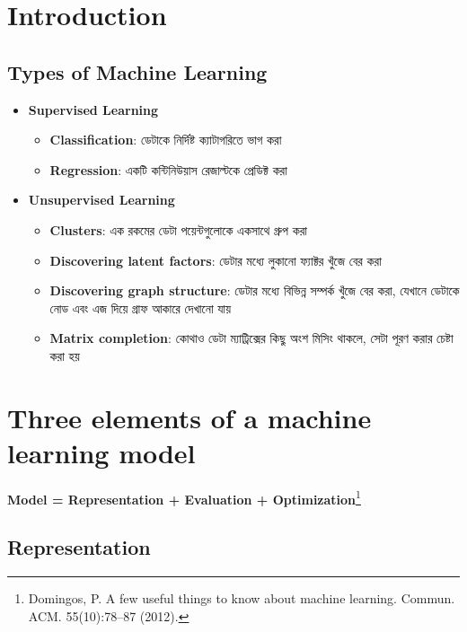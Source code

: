 \documentclass[graybox, envcountchap, twocolumn]{styles/svmult}
\begin{document}
\section{Introduction}

\subsection{Types of Machine Learning}

\begin{itemize}
    \item \textbf{Supervised Learning}
    \begin{itemize}
        \item \textbf{Classification}: {\bengalifont ডেটাকে নির্দিষ্ট ক্যাটাগরিতে ভাগ করা}
        \item \textbf{Regression}: {\bengalifont একটি কন্টিনিউয়াস রেজাল্টকে প্রেডিক্ট করা}
    \end{itemize}
    \item \textbf{Unsupervised Learning}
    \begin{itemize}
        \item \textbf{Clusters}: {\bengalifont এক রকমের ডেটা পয়েন্টগুলোকে একসাথে গ্রুপ করা}
        \item \textbf{Discovering latent factors}: {\bengalifont ডেটার মধ্যে লুকানো ফ্যাক্টর খুঁজে বের করা}
        \item \textbf{Discovering graph structure}: {\bengalifont ডেটার মধ্যে বিভিন্ন সম্পর্ক খুঁজে বের করা, যেখানে ডেটাকে নোড এবং এজ দিয়ে গ্রাফ আকারে দেখানো যায়}
        \item \textbf{Matrix completion}: {\bengalifont কোথাও ডেটা ম্যাট্রিক্সের কিছু অংশ মিসিং থাকলে, সেটা পূরণ করার চেষ্টা করা হয়}
    \end{itemize}
\end{itemize}


\section{Three elements of a machine learning model}

\textbf{Model = Representation + Evaluation + Optimization}\footnote{Domingos, P. A few useful things to know about machine learning. Commun. ACM. 55(10):78–87 (2012).}


\subsection{Representation}
\end{document}
